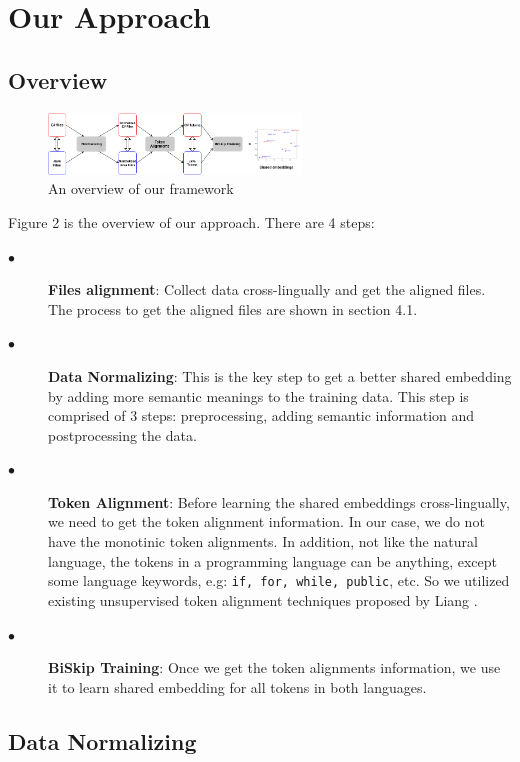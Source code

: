 \section{Our Approach}
\subsection{Overview}

\begin{figure}[t!]
	\includegraphics[width=0.60\textwidth]{approach}
	\caption{An overview of our framework}
	\label{fig:clf}
\end{figure}



Figure 2 is the overview of our approach. There are 4 steps:
\begin{description}
    \item [$\bullet$] \textbf{Files alignment}: Collect data cross-lingually and get the aligned files. The process to get the aligned files are shown in section 4.1.
	\item [$\bullet$]\textbf{Data Normalizing}: This is the key step to get a better shared embedding by adding more semantic meanings to the training data. This step is comprised of 3 steps: preprocessing, adding semantic information and postprocessing the data.
	\item [$\bullet$] \textbf{Token Alignment}: Before learning the shared embeddings cross-lingually, we need to get the token alignment information. In our case, we do not have the monotinic token alignments. In addition, not like the natural language, the tokens in a programming language can be anything, except some language keywords, e.g: \texttt{if, for, while, public}, etc. So we utilized existing unsupervised token alignment techniques proposed by Liang \cite{liang2006alignment}.
	\item [$\bullet$] \textbf{BiSkip Training}: Once we get the token alignments information, we use it to learn shared embedding for all tokens in both languages.
\end{description}




\subsection{Data Normalizing}

